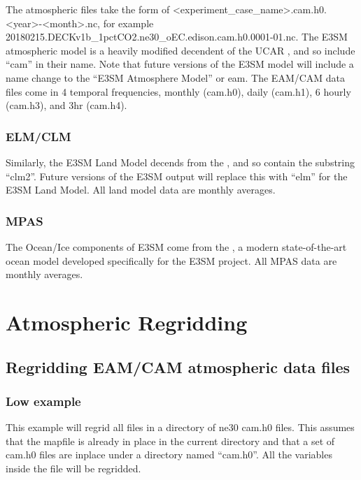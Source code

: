 \documentclass[letterpaper,10pt,english]{sphinxmanual}
\begin{document}
The atmospheric files take the form of \textless{}experiment\_case\_name\textgreater{}.cam.h0.\textless{}year\textgreater{}-\textless{}month\textgreater{}.nc, for example 20180215.DECKv1b\_1pctCO2.ne30\_oEC.edison.cam.h0.0001-01.nc. The E3SM atmospheric model is a heavily modified decendent of the
UCAR , and so include “cam” in their name. Note that future versions of the E3SM model will include a name change to the “E3SM Atmosphere Model” or eam. The EAM/CAM
data files come in 4 temporal frequencies, monthly (cam.h0), daily (cam.h1), 6 hourly (cam.h3), and 3hr (cam.h4).


\subsection{ELM/CLM}
\label{\detokenize{guide:elm-clm}}
Similarly, the E3SM Land Model decends from the , and so contain the substring “clm2”. Future versions of the E3SM output will replace this with
“elm” for the E3SM Land Model. All land model data are monthly averages.


\subsection{MPAS}
\label{\detokenize{guide:mpas}}
The Ocean/Ice components of E3SM come from the , a modern state-of-the-art ocean model developed specifically for the E3SM project. All MPAS
data are monthly averages.


\chapter{Atmospheric Regridding}
\label{\detokenize{atm_regrid:atmospheric-regridding}}\label{\detokenize{atm_regrid:atm-regrid}}\label{\detokenize{atm_regrid::doc}}

\section{Regridding EAM/CAM atmospheric data files}
\label{\detokenize{atm_regrid:regridding-eam-cam-atmospheric-data-files}}

\subsection{Low example}
\label{\detokenize{atm_regrid:low-example}}
This example will regrid all files in a directory of ne30 cam.h0 files. This assumes that the mapfile is already in place in the current
directory and that a set of cam.h0 files are inplace under a directory named “cam.h0”. All the variables inside the file will be regridded.
\end{document}
